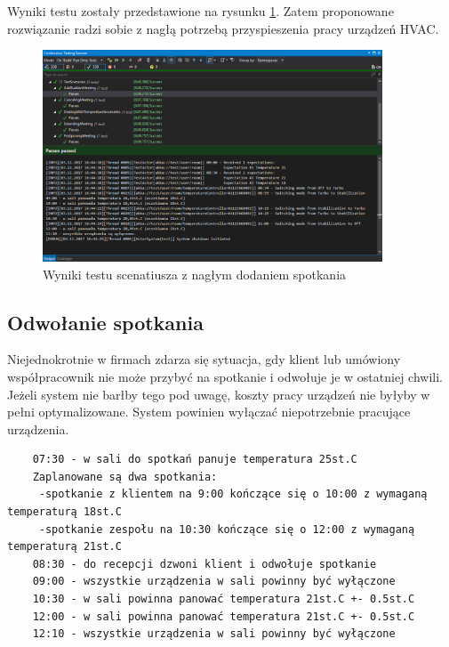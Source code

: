 Wyniki testu zostały przedstawione na rysunku \ref{fig:AddSuddenMeeting}.
Zatem proponowane rozwiązanie radzi sobie z nagłą potrzebą przyspieszenia pracy urządzeń HVAC. 
\begin{figure}[hb]
    \centering
    \includegraphics[width=0.90\textwidth]{./screenshots/AddSuddenMeeting.png}
    \caption{Wyniki testu scenatiusza z nagłym dodaniem spotkania}
    \label{fig:AddSuddenMeeting}    
\end{figure}

\subsection{Odwołanie spotkania}
Niejednokrotnie w firmach zdarza się sytuacja, gdy klient lub umówiony współpracownik nie może przybyć na spotkanie i odwołuje je w ostatniej chwili.
Jeżeli system nie barłby tego pod uwagę, koszty pracy urządzeń nie byłyby w pełni optymalizowane. System powinien wyłączać niepotrzebnie pracujące urządzenia.
\begin{lstlisting}
    07:30 - w sali do spotkań panuje temperatura 25st.C
    Zaplanowane są dwa spotkania:
     -spotkanie z klientem na 9:00 kończące się o 10:00 z wymaganą temperaturą 18st.C    
     -spotkanie zespołu na 10:30 kończące się o 12:00 z wymaganą temperaturą 21st.C
    08:30 - do recepcji dzwoni klient i odwołuje spotkanie
    09:00 - wszystkie urządzenia w sali powinny być wyłączone
    10:30 - w sali powinna panować temperatura 21st.C +- 0.5st.C
    12:00 - w sali powinna panować temperatura 21st.C +- 0.5st.C
    12:10 - wszystkie urządzenia w sali powinny być wyłączone
\end{lstlisting}


